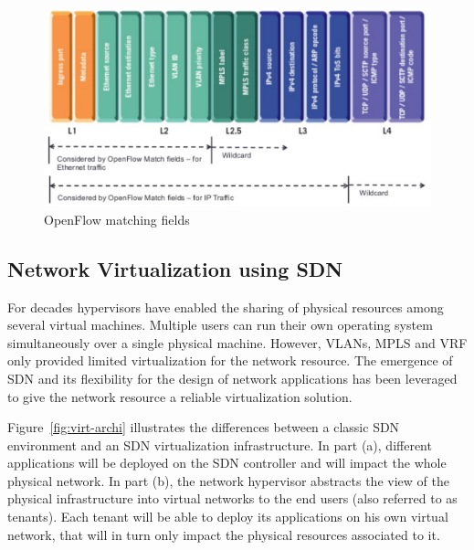 \begin{figure}[h]
    \centering
    \includegraphics[scale=0.7]{figures/openflow-matchfields.pdf}
    \caption{OpenFlow matching fields~\cite{openflow-matchfields}}
    \label{fig:matching-fields}
\end{figure}

\subsection{Network Virtualization using SDN}
\label{def:netvirt}

For decades hypervisors have enabled the sharing of physical resources among several virtual machines.
Multiple users can run their own operating system simultaneously over a single physical machine.
However, VLANs, MPLS and VRF only provided limited virtualization for the network resource. The emergence of SDN and its flexibility for the design of network applications has been leveraged to give the network resource a reliable virtualization solution.

Figure~\ref{fig:virt-archi} illustrates the differences between a classic SDN environment and an SDN virtualization infrastructure. In part (a), different applications will be deployed on the SDN controller and will impact the whole physical network.
In part (b), the network hypervisor abstracts the view of the physical infrastructure into virtual networks to the end users (also referred to as tenants).
Each tenant will be able to deploy its applications on his own virtual network, that will in turn only impact the physical resources associated to it.

